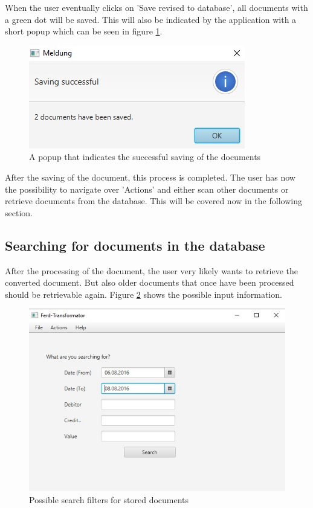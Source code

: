 When the user eventually clicks on 'Save revised to database', all documents with a green dot will be saved. This will also be indicated by the application with a short popup which can be seen in figure \ref{savingSuccessful}.

\begin{figure}[ht!]
\centering
\includegraphics[scale=0.6]{Images/GUI/SavingSuccessful.jpg}
\caption{A popup that indicates the successful saving of the documents \label{savingSuccessful}}
\end{figure}

After the saving of the document, this process is completed. The user has now the possibility to navigate over 'Actions' and either scan other documents or retrieve documents from the database. This will be covered now in the following section.

\subsection{Searching for documents in the database}
\label{sec5.8.2}

After the processing of the document, the user very likely wants to retrieve the converted document. But also older documents that once have been processed should be retrievable again.
Figure \ref{searchInDatabase} shows the possible input information. 

\begin{figure}[ht!]
\centering
\includegraphics[scale=0.6]{Images/GUI/SearchInDatabase.jpg}
\caption{Possible search filters for stored documents \label{searchInDatabase}}
\end{figure}


